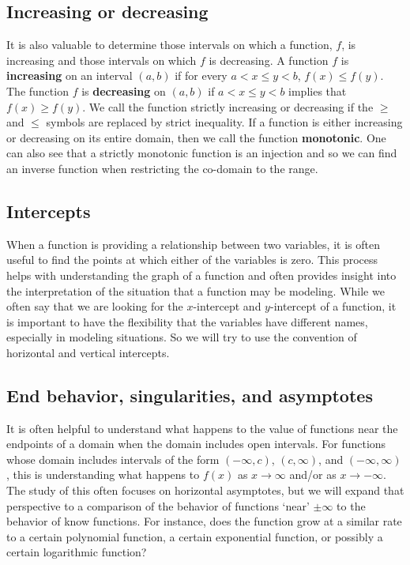 \documentclass[
]{book}
\theoremstyle{definition}
\theoremstyle{definition}
\theoremstyle{definition}
\theoremstyle{definition}
\theoremstyle{remark}
\begin{document}
\hypertarget{increasing-or-decreasing}{%
\subsection{Increasing or decreasing}\label{increasing-or-decreasing}}

It is also valuable to determine those intervals on which a function, \(f\), is increasing and those intervals on which \(f\) is decreasing. A function \(f\) is \textbf{increasing} on an interval \((a,b)\) if for every \(a<x\leq y<b\), \(f(x)\leq f(y)\). The function \(f\) is \textbf{decreasing} on \((a,b)\) if \(a<x\leq y<b\) implies that \(f(x)\geq f(y)\). We call the function strictly increasing or decreasing if the \(\geq\) and \(\leq\) symbols are replaced by strict inequality. If a function is either increasing or decreasing on its entire domain, then we call the function \textbf{monotonic}. One can also see that a strictly monotonic function is an injection and so we can find an inverse function when restricting the co-domain to the range.

\hypertarget{intercepts}{%
\subsection{Intercepts}\label{intercepts}}

When a function is providing a relationship between two variables, it is often useful to find the points at which either of the variables is zero. This process helps with understanding the graph of a function and often provides insight into the interpretation of the situation that a function may be modeling. While we often say that we are looking for the \(x\)-intercept and \(y\)-intercept of a function, it is important to have the flexibility that the variables have different names, especially in modeling situations. So we will try to use the convention of horizontal and vertical intercepts.

\hypertarget{end-behavior-singularities-and-asymptotes}{%
\subsection{End behavior, singularities, and asymptotes}\label{end-behavior-singularities-and-asymptotes}}

It is often helpful to understand what happens to the value of functions near the endpoints of a domain when the domain includes open intervals. For functions whose domain includes intervals of the form \((-\infty,c)\), \((c,\infty)\), and \((-\infty, \infty)\), this is understanding what happens to \(f(x)\) as \(x\rightarrow \infty\) and/or as \(x \rightarrow -\infty\). The study of this often focuses on horizontal asymptotes, but we will expand that perspective to a comparison of the behavior of functions `near' \(\pm \infty\) to the behavior of know functions. For instance, does the function grow at a similar rate to a certain polynomial function, a certain exponential function, or possibly a certain logarithmic function?
\end{document}
